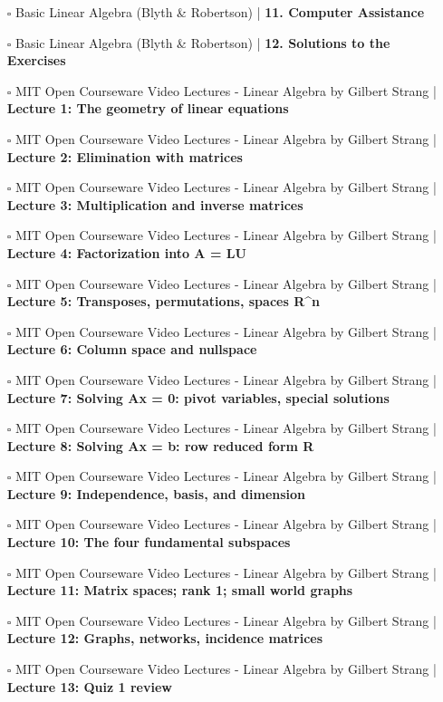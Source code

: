 \documentclass[a4, landscape, 12pt]{article}
\newcommand{\checkbox}{$\square$}%
\begin{document}
\begin{itemize}
{}
\item [\checkbox] Basic Linear Algebra (Blyth & Robertson)  | \textbf{11. Computer Assistance
}
\item [\checkbox] Basic Linear Algebra (Blyth & Robertson)  | \textbf{12. Solutions to the Exercises
}
\item [\checkbox] MIT Open Courseware Video Lectures - Linear Algebra by Gilbert Strang  | \textbf{Lecture 1: The geometry of linear equations
}
\item [\checkbox] MIT Open Courseware Video Lectures - Linear Algebra by Gilbert Strang  | \textbf{Lecture 2: Elimination with matrices
}
\item [\checkbox] MIT Open Courseware Video Lectures - Linear Algebra by Gilbert Strang  | \textbf{Lecture 3: Multiplication and inverse matrices
}
\item [\checkbox] MIT Open Courseware Video Lectures - Linear Algebra by Gilbert Strang  | \textbf{Lecture 4: Factorization into A = LU
}
\item [\checkbox] MIT Open Courseware Video Lectures - Linear Algebra by Gilbert Strang  | \textbf{Lecture 5: Transposes, permutations, spaces R^n
}
\item [\checkbox] MIT Open Courseware Video Lectures - Linear Algebra by Gilbert Strang  | \textbf{Lecture 6: Column space and nullspace
}
\item [\checkbox] MIT Open Courseware Video Lectures - Linear Algebra by Gilbert Strang  | \textbf{Lecture 7: Solving Ax = 0: pivot variables, special solutions
}
\item [\checkbox] MIT Open Courseware Video Lectures - Linear Algebra by Gilbert Strang  | \textbf{Lecture 8: Solving Ax = b: row reduced form R
}
\item [\checkbox] MIT Open Courseware Video Lectures - Linear Algebra by Gilbert Strang  | \textbf{Lecture 9: Independence, basis, and dimension
}
\item [\checkbox] MIT Open Courseware Video Lectures - Linear Algebra by Gilbert Strang  | \textbf{Lecture 10: The four fundamental subspaces
}
\item [\checkbox] MIT Open Courseware Video Lectures - Linear Algebra by Gilbert Strang  | \textbf{Lecture 11: Matrix spaces; rank 1; small world graphs
}
\item [\checkbox] MIT Open Courseware Video Lectures - Linear Algebra by Gilbert Strang  | \textbf{Lecture 12: Graphs, networks, incidence matrices
}
\item [\checkbox] MIT Open Courseware Video Lectures - Linear Algebra by Gilbert Strang  | \textbf{Lecture 13: Quiz 1 review
}
\end{itemize}
\end{document}
